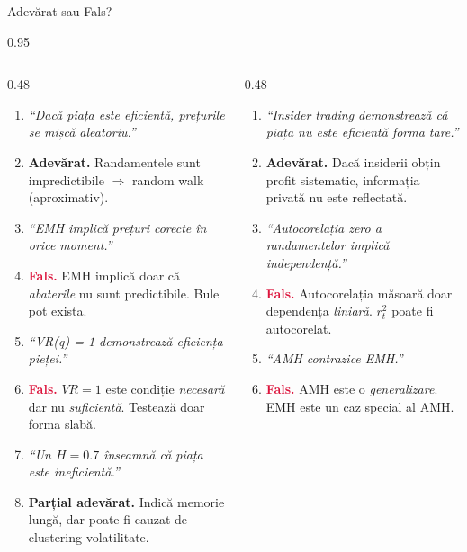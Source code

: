 \documentclass[9pt, aspectratio=169, t]{beamer}
\begin{document}
\begin{frame}{Adevărat sau Fals?}
    \begin{cminipage}{0.95\textwidth}
\footnotesize
\begin{columns}[T]
\begin{column}{0.48\textwidth}
\begin{enumerate}\setlength{\itemsep}{1pt}
    \item \textit{``Dacă piața este eficientă, prețurile se mișcă aleatoriu.''}
    \item[] \textcolor{Forest}{\textbf{Adevărat.}} Randamentele sunt impredictibile $\Rightarrow$ random walk (aproximativ).

    \item \textit{``EMH implică prețuri corecte în orice moment.''}
    \item[] \textcolor{Crimson}{\textbf{Fals.}} EMH implică doar că \textit{abaterile} nu sunt predictibile. Bule pot exista.

    \item \textit{``VR(q) = 1 demonstrează eficiența pieței.''}
    \item[] \textcolor{Crimson}{\textbf{Fals.}} $VR=1$ este condiție \textit{necesară} dar nu \textit{suficientă}. Testează doar forma slabă.

    \item \textit{``Un $H = 0.7$ înseamnă că piața este ineficientă.''}
    \item[] \textcolor{Forest}{\textbf{Parțial adevărat.}} Indică memorie lungă, dar poate fi cauzat de clustering volatilitate.
\end{enumerate}
\end{column}
\begin{column}{0.48\textwidth}
\begin{enumerate}\setlength{\itemsep}{1pt}
    \setcounter{enumi}{4}
    \item \textit{``Insider trading demonstrează că piața nu este eficientă forma tare.''}
    \item[] \textcolor{Forest}{\textbf{Adevărat.}} Dacă insiderii obțin profit sistematic, informația privată nu este reflectată.

    \item \textit{``Autocorelația zero a randamentelor implică independență.''}
    \item[] \textcolor{Crimson}{\textbf{Fals.}} Autocorelația măsoară doar dependența \textit{liniară}. $r_t^2$ poate fi autocorelat.

    \item \textit{``AMH contrazice EMH.''}
    \item[] \textcolor{Crimson}{\textbf{Fals.}} AMH este o \textit{generalizare}. EMH este un caz special al AMH.
\end{enumerate}
\end{column}
\end{columns}
    \end{cminipage}
\end{frame}
\end{document}
